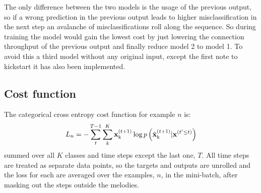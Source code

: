 	The only difference between the two models is the usage of the previous output, so if a wrong prediction in the previous output leads to higher misclassification in the next step an avalanche of misclassifications roll along the sequence. So during training the model would gain the lowest cost by just lowering the connection throughput of the previous output and finally reduce model 2 to model 1.
	To avoid this a third model without any original input, except the first note to kickstart it has also been implemented.

	\subsection{Cost function} 
	The categorical cross entropy cost function for example $n$ is:
	\begin{equation}
		L_n = -\sum^{T-1}_{t}\sum^{K}_{k} \bm{\mathrm{x}}^{(t+1)}_{\text{k}} \log p\left(\tilde{\bm{\mathrm{x}}}^{(t+1)}_{\text{k}}|\bm{\mathrm{x}}^{(t'\le t)}\right)
	\end{equation}
	summed over all $K$ classes and time steps except the last one, $T$. All time steps are treated as separate data points, so the targets and outputs are unrolled and the loss for each are averaged over the examples, $n$, in the mini-batch, after masking out the steps outside the melodies. 







